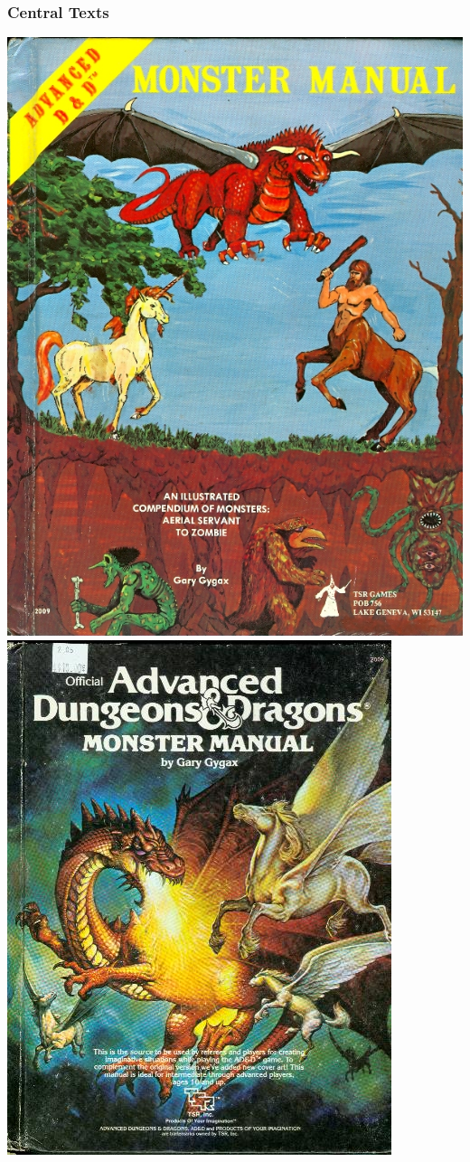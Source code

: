 \documentclass{beamer}\usepackage{graphicx, color}
\begin{document}
\begin{frame}
  \frametitle{Central Texts}
  \begin{center}
  \noindent
  \includegraphics[height = 0.4\textheight, keepaspectratio = true]{mm1}\hspace{0.2\textwidth}%
  \includegraphics[height = 0.4\textheight, keepaspectratio = true]{mm2}\\[2em]

\end{center}
\end{frame}
\end{document}

